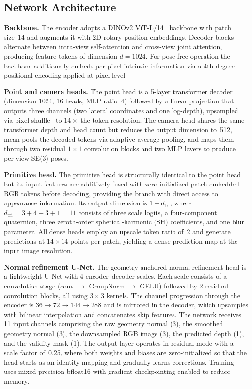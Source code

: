 \documentclass{llmxive}
\providecommand{\boldstart}[1]{\vspace{0.1in}\noindent\textbf{#1}}
\begin{document}
\subsection{Network Architecture}
\label{sec:app_architecture}

\boldstart{Backbone.}
The encoder adopts a DINOv2 ViT-L/14~\citep{oquab2023dinov2} backbone with patch size~14 and augments it with 2D rotary position embeddings. Decoder blocks alternate between intra-view self-attention and cross-view joint attention, producing feature tokens of dimension $d\!=\!1024$. For pose-free operation the backbone additionally embeds per-pixel intrinsic information via a 4th-degree positional encoding applied at pixel level.

\boldstart{Point and camera heads.}
The point head is a 5-layer transformer decoder (dimension 1024, 16 heads, MLP ratio~4) followed by a linear projection that outputs three channels (two lateral coordinates and one log-depth), upsampled via pixel-shuffle~\citep{shi2016real} to $14\!\times$ the token resolution. The camera head shares the same transformer depth and head count but reduces the output dimension to~512, mean-pools the decoded tokens via adaptive average pooling, and maps them through two residual $1\!\times\!1$ convolution blocks and two MLP layers to produce per-view SE(3) poses.

\boldstart{Primitive head.}
The primitive head is structurally identical to the point head but its input features are additively fused with zero-initialized patch-embedded RGB tokens before decoding, providing the branch with direct access to appearance information. Its output dimension is $1 + d_{\mathrm{tri}}$, where $d_{\mathrm{tri}} = 3 + 4 + 3 + 1 = 11$ consists of three scale logits, a four-component quaternion, three zeroth-order spherical-harmonic (SH) coefficients, and one blur parameter. All dense heads employ an upscale token ratio of~2 and generate predictions at $14 \times 14$ points per patch, yielding a dense prediction map at the input image resolution.

\boldstart{Normal refinement U-Net.}
The geometry-anchored normal refinement head is a lightweight U-Net with 4 encoder--decoder scales. Each scale consists of a convolution stage (conv $\to$ GroupNorm $\to$ GELU) followed by 2 residual convolution blocks, all using $3\!\times\!3$ kernels. The channel progression through the encoder is $36 \to 72 \to 144 \to 288$ and is mirrored in the decoder, which upsamples with bilinear interpolation and concatenates skip features. The network receives 11 input channels comprising the raw geometry normal (3), the smoothed geometry normal (3), the downsampled RGB image (3), the predicted depth (1), and the validity mask (1). The output layer operates in residual mode with a scale factor of~0.25, where both weights and biases are zero-initialized so that the head starts as an identity mapping and gradually learns corrections. Training uses mixed-precision bfloat16 with gradient checkpointing enabled to reduce memory.
\end{document}
